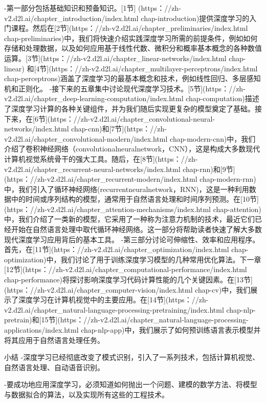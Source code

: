 -第一部分包括基础知识和预备知识。[1节]
(https：//zh-v2.d2l.ai/chapter\_introduction/index.html chap-introduction)提供深度学习的入门课程。然后在[2节](https：//zh-v2.d2l.ai/chapter\_preliminaries/index.html chap-preliminaries)中，我们将快速介绍实践深度学习所需的前提条件，例如如何存储和处理数据，以及如何应用基于线性代数、微积分和概率基本概念的各种数值运算。[3节](https：//zh-v2.d2l.ai/chapter\_linear-networks/index.html chap-linear) 和[4节](https：//zh-v2.d2l.ai/chapter\_multilayer-perceptrons/index.html chap-perceptrons)涵盖了深度学习的最基本概念和技术，例如线性回归、多层感知机和正则化。
-接下来的五章集中讨论现代深度学习技术。[5节](https：//zh-v2.d2l.ai/chapter\_deep-learning-computation/index.html chap-computation)描述了深度学习计算的各种关键组件，并为我们随后实现更复杂的模型奠定了基础。接下来，在[6节](https：//zh-v2.d2l.ai/chapter\_convolutional-neural-networks/index.html chap-cnn)和[7节](https：//zh-v2.d2l.ai/chapter\_convolutional-modern/index.html chap-modern-cnn)中，我们介绍了卷积神经网络（convolutionalneuralnetwork，CNN），这是构成大多数现代计算机视觉系统骨干的强大工具。随后，在[8节](https：//zh-v2.d2l.ai/chapter\_recurrent-neural-networks/index.html chap-rnn)和[9节](https：//zh-v2.d2l.ai/chapter\_recurrent-modern/index.html chap-modern-rnn)中，我们引入了循环神经网络(recurrentneuralnetwork，RNN)，这是一种利用数据中的时间或序列结构的模型，通常用于自然语言处理和时间序列预测。在[10节](https：//zh-v2.d2l.ai/chapter\_attention-mechanisms/index.html chap-attention)中，我们介绍了一类新的模型，它采用了一种称为注意力机制的技术，最近它们已经开始在自然语言处理中取代循环神经网络。这一部分将帮助读者快速了解大多数现代深度学习应用背后的基本工具。
-第三部分讨论可伸缩性、效率和应用程序。首先，在[11节](https：//zh-v2.d2l.ai/chapter\_optimization/index.html chap-optimization)中，我们讨论了用于训练深度学习模型的几种常用优化算法。下一章[12节](https：//zh-v2.d2l.ai/chapter\_computational-performance/index.html chap-performance)将探讨影响深度学习代码计算性能的几个关键因素。在[13节](https：//zh-v2.d2l.ai/chapter\_computer-vision/index.html chap-cv)中，我们展示了深度学习在计算机视觉中的主要应用。在[14节](https：//zh-v2.d2l.ai/chapter\_natural-language-processing-pretraining/index.html chap-nlp-pretrain)和[15节](https：//zh-v2.d2l.ai/chapter\_natural-language-processing-applications/index.html chap-nlp-app)中，我们展示了如何预训练语言表示模型并将其应用于自然语言处理任务。

     小结
-深度学习已经彻底改变了模式识别，引入了一系列技术，包括计算机视觉、自然语言处理、自动语音识别。

-要成功地应用深度学习，必须知道如何抛出一个问题、建模的数学方法、将模型与数据拟合的算法，以及实现所有这些的工程技术。


